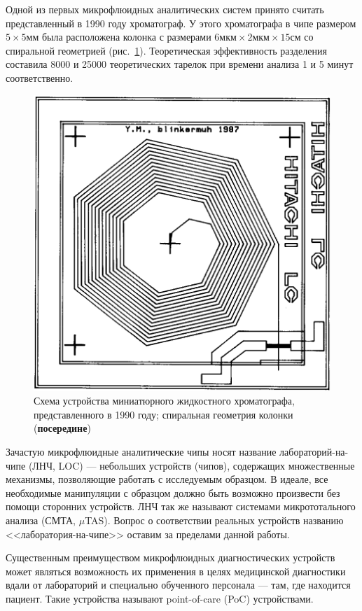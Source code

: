 \documentclass[oneside,final,12pt]{extreport}
\begin{document}
Одной из первых микрофлюидных аналитических систем принято считать
представленный в 1990 году хроматограф\cite{bib:early_chromatograph}.
У этого хроматографа в чипе размером $5\times5\text{мм}$ была
расположена
колонка с размерами
$6\text{мкм} \times 2\text{мкм} \times 15\text{см}$
со спиральной геометрией (рис.~\ref{fig:miniature_chromatograph_scheme}).
Теоретическая эффективность разделения составила 8000 и 25000 теоретических тарелок
при времени анализа 1 и 5 минут соответственно.

\begin{figure}
  \centering
  \includegraphics[width=.5\textwidth]{pic/miniature_chromatograph_scheme}

  \caption{%
    \label{fig:miniature_chromatograph_scheme}%
    Схема устройства миниатюрного жидкостного хроматографа, представленного в 1990 году;
    спиральная геометрия колонки (\textbf{посередине})
  }

\end{figure}

Зачастую микрофлюидные аналитические чипы
носят название лабораторий-на-чипе (ЛНЧ, LOC) ---
небольших устройств (чипов), содержащих
множественные механизмы, позволяющие работать с исследуемым образцом.
В идеале, все необходимые манипуляции с образцом должно быть возможно произвести
без помощи сторонних устройств.
ЛНЧ так же называют системами микрототального анализа (СМТА, $\mu$TAS).
Вопрос о соответствии реальных устройств названию <<лаборатория-на-чипе>>
оставим за пределами данной работы.

Существенным преимуществом микрофлюидных диагностических устройств
может являться возможность их применения в целях медицинской диагностики
вдали от лабораторий и специально обученного персонала --- там,
где находится пациент.
Такие устройства называют point-of-care (PoC) устройствами\cite{bib:PoC_trends}.
\end{document}
